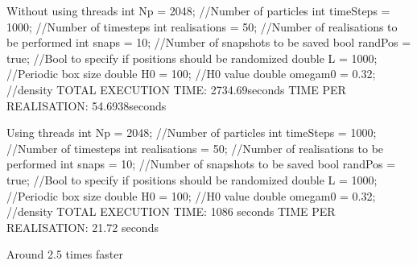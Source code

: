 Without using threads
int Np = 2048;  //Number of particles
int timeSteps = 1000;  //Number of timesteps
int realisations = 50;  //Number of realisations to be performed
int snaps = 10;  //Number of snapshots to be saved
bool randPos = true;  //Bool to specify if positions should be randomized
double L = 1000;  //Periodic box size
double H0 = 100;  //H0 value
double omegam0 = 0.32;  //density
TOTAL EXECUTION TIME: 2734.69seconds
TIME PER REALISATION: 54.6938seconds


Using threads
int Np = 2048;  //Number of particles
int timeSteps = 1000;  //Number of timesteps
int realisations = 50;  //Number of realisations to be performed
int snaps = 10;  //Number of snapshots to be saved
bool randPos = true;  //Bool to specify if positions should be randomized
double L = 1000;  //Periodic box size
double H0 = 100;  //H0 value
double omegam0 = 0.32;  //density
TOTAL EXECUTION TIME: 1086 seconds
TIME PER REALISATION: 21.72 seconds

Around 2.5 times faster